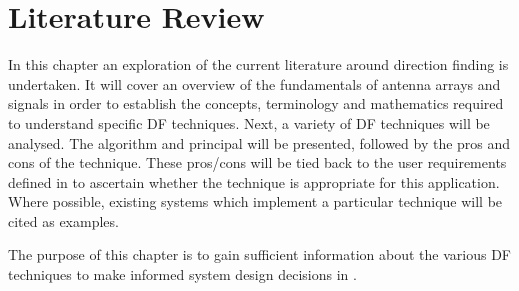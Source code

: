 \chapter{Literature Review}
\label{ch:lit-review}
In this chapter an exploration of the current literature around direction finding is undertaken.
It will cover an overview of the fundamentals of antenna arrays and signals in order to establish the concepts, terminology and mathematics required to understand specific DF techniques. 
Next, a variety of DF techniques will be analysed. The algorithm and principal will be presented, followed by the pros and cons of the technique. These pros/cons will be tied back to the user requirements defined in  to ascertain whether the technique is appropriate for this application. Where possible, existing systems which implement a particular technique will be cited as examples.

The purpose of this chapter is to gain sufficient information about the various DF techniques to make informed system design decisions in .




